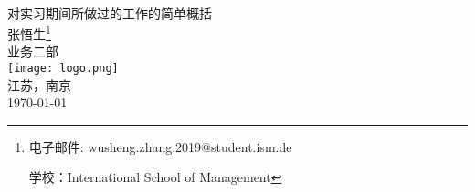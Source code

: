 \documentclass[H:\workspace\实习日志\ShixiRizhi.tex]{subfiles}
\begin{document}
\begin{titlepage}
    \centering
    \vspace{1cm}
     \\
    \vspace{0.5cm}
    \xiaoerhao 对实习期间所做过的工作的简单概括 \\
    \vspace{0.5cm}
    \xiaoerhao 张悟生\footnote{电子邮件: wusheng.zhang.2019@student.ism.de \par 
    学校：International School of Management}\\
    业务二部 \\
    \centering
    \texttt{[image: logo.png]}\\
    \normalsize 江苏，南京 \\ 
    \today
\end{titlepage}
\end{document}
